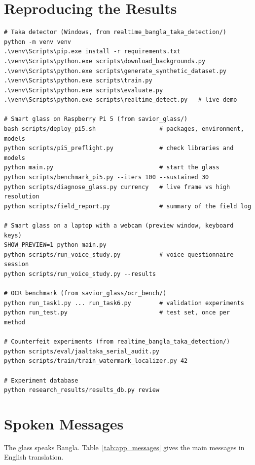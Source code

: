 \section{Reproducing the Results}
\label{app:repro}
\begin{lstlisting}
# Taka detector (Windows, from realtime_bangla_taka_detection/)
python -m venv venv
.\venv\Scripts\pip.exe install -r requirements.txt
.\venv\Scripts\python.exe scripts\download_backgrounds.py
.\venv\Scripts\python.exe scripts\generate_synthetic_dataset.py
.\venv\Scripts\python.exe scripts\train.py
.\venv\Scripts\python.exe scripts\evaluate.py
.\venv\Scripts\python.exe scripts\realtime_detect.py   # live demo

# Smart glass on Raspberry Pi 5 (from savior_glass/)
bash scripts/deploy_pi5.sh                  # packages, environment, models
python scripts/pi5_preflight.py             # check libraries and models
python main.py                              # start the glass
python scripts/benchmark_pi5.py --iters 100 --sustained 30
python scripts/diagnose_glass.py currency   # live frame vs high resolution
python scripts/field_report.py              # summary of the field log

# Smart glass on a laptop with a webcam (preview window, keyboard keys)
SHOW_PREVIEW=1 python main.py
python scripts/run_voice_study.py           # voice questionnaire session
python scripts/run_voice_study.py --results

# OCR benchmark (from savior_glass/ocr_bench/)
python run_task1.py ... run_task6.py        # validation experiments
python run_test.py                          # test set, once per method

# Counterfeit experiments (from realtime_bangla_taka_detection/)
python scripts/eval/jaaltaka_serial_audit.py
python scripts/train/train_watermark_localizer.py 42

# Experiment database
python research_results/results_db.py review
\end{lstlisting}

\section{Spoken Messages}
\label{app:messages}
The glass speaks Bangla. Table~\ref{tab:app_messages} gives the main messages in English translation.


